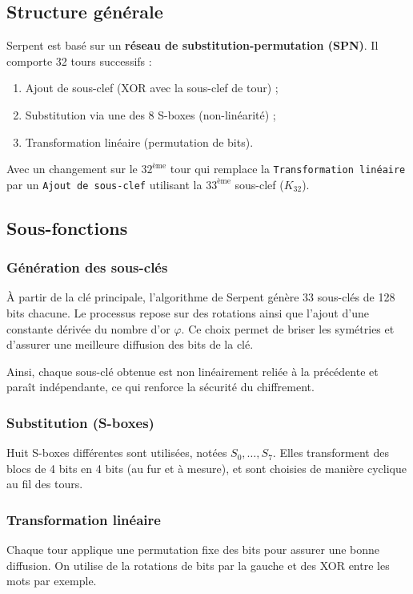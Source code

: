 \documentclass[12pt,a4paper]{report}
\begin{document}
\setcounter{subsection}{0}

\subsection{Structure générale}
Serpent est basé sur un \textbf{réseau de substitution-permutation (SPN)}.  
Il comporte 32 tours successifs :
\begin{enumerate}
    \item Ajout de sous-clef (XOR avec la sous-clef de tour) ;
    \item Substitution via une des 8 S-boxes (non-linéarité) ;
    \item Transformation linéaire (permutation de bits).
\end{enumerate}
Avec un changement sur le $32^{\text{ème}}$ tour qui remplace la \texttt{Transformation linéaire} par un \texttt{Ajout de sous-clef} utilisant la $33^{\text{ème}}$ sous-clef ($K_{32}$).

\subsection{Sous-fonctions}

\subsubsection{Génération des sous-clés}

À partir de la clé principale, l’algorithme de Serpent génère 33 sous-clés de 128 bits chacune.  
Le processus repose sur des rotations ainsi que l’ajout d’une constante dérivée du nombre d’or \(\varphi\).  
Ce choix permet de briser les symétries et d’assurer une meilleure diffusion des bits de la clé.  

Ainsi, chaque sous-clé obtenue est non linéairement reliée à la précédente et paraît indépendante, ce qui renforce la sécurité du chiffrement.  

\subsubsection{Substitution (S-boxes)}
Huit S-boxes différentes sont utilisées, notées $S_0, \dots, S_7$.  
Elles transforment des blocs de 4 bits en 4 bits (au fur et à mesure), et sont choisies de manière cyclique au fil des tours.

\subsubsection{Transformation linéaire}
Chaque tour applique une permutation fixe des bits pour assurer une bonne diffusion. On utilise de la rotations de bits par la gauche et des XOR entre les mots par exemple.
\end{document}
